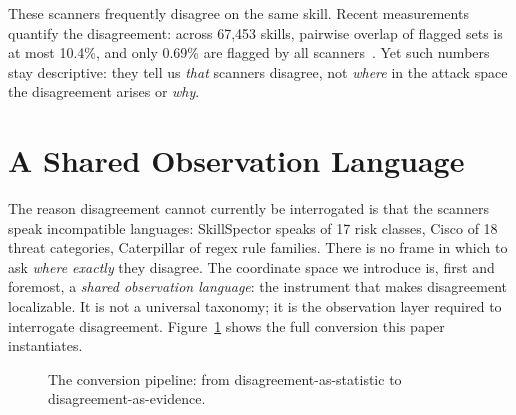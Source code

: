 \documentclass[sigconf,nonacm]{acmart}
\begin{document}
These scanners frequently disagree on the same skill. Recent measurements quantify the disagreement: across 67{,}453 skills, pairwise overlap of flagged sets is at most 10.4\%, and only 0.69\% are flagged by all scanners~\cite{clawhub2026}. Yet such numbers stay descriptive: they tell us \emph{that} scanners disagree, not \emph{where} in the attack space the disagreement arises or \emph{why}.

\section{A Shared Observation Language}
\label{sec:measure}

The reason disagreement cannot currently be interrogated is that the scanners speak incompatible languages: SkillSpector speaks of 17 risk classes, Cisco of 18 threat categories, Caterpillar of regex rule families. There is no frame in which to ask \emph{where exactly} they disagree. The coordinate space we introduce is, first and foremost, a \emph{shared observation language}: the instrument that makes disagreement localizable. It is not a universal taxonomy; it is the observation layer required to interrogate disagreement. Figure~\ref{fig:pipeline} shows the full conversion this paper instantiates.

\begin{figure}[t]
\centering
{}
\caption{The conversion pipeline: from disagreement-as-statistic to disagreement-as-evidence.}
\label{fig:pipeline}
\end{figure}
\end{document}

